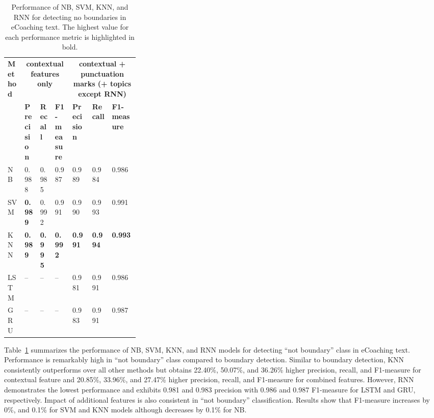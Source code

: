\documentclass{amia}
\begin{document}
\begin{table}[ht]
\centering
\caption{Performance of NB, SVM, KNN, and RNN  for detecting no boundaries in eCoaching text. The highest value for each performance metric is highlighted in bold.}
\label{tab:result_not_boundary}
  \begin{tabular}{|l|l|l|l|p{0.15\linewidth}|p{0.15\linewidth}|l|}
  \hline
   \multirow{2}{*}{\textbf{Method}} & \multicolumn{3}{|c|}{\textbf{contextual features only}} & \multicolumn{3}{|c|}{\textbf{contextual + punctuation marks (+ topics except RNN)}} \\\cline{2-7}
   & \textbf{Precision}  & \textbf{Recall} & \textbf{F1-measure} & \textbf{Precision}  & \textbf{Recall} & \textbf{F1-measure}\\ \hline    
    
 NB & 0.988 & 0.985 & 0.987 & 0.989 & 0.984 & 0.986 \\ \hline
 SVM & \textbf{0.989} & 0.992 & 0.991 & 0.990 & 0.993 & 0.991\\ \hline
 KNN & \textbf{0.989} & \textbf{0.995} & \textbf{0.992} & \textbf{0.991} & \textbf{0.994} & \textbf{0.993}\\ \hline
 LSTM & -- & -- & -- & 0.981 & 0.991 & 0.986 \\ \hline
 GRU & -- & -- & -- & 0.983 & 0.991 & 0.987 \\ \hline 
  \end{tabular}
\end{table}

Table~\ref{tab:result_not_boundary} summarizes the performance of NB, SVM, KNN, and RNN models for detecting ``not boundary'' class in eCoaching text. Performance is remarkably high in ``not boundary'' class compared to boundary detection. Similar to boundary detection, KNN consistently outperforms over all other methods but obtains 22.40\%, 50.07\%, and 36.26\% higher precision, recall, and F1-measure for contextual feature and 20.85\%, 33.96\%, and 27.47\% higher precision, recall, and F1-measure for combined features. However, RNN demonstrates the lowest performance and exhibits 0.981 and 0.983 precision with 0.986 and 0.987 F1-measure for LSTM and GRU, respectively. Impact of additional features is also consistent in ``not boundary'' classification. Results show that F1-measure increases by 0\%, and 0.1\% for SVM and KNN models although decreases by 0.1\% for NB. \\
\end{document}
